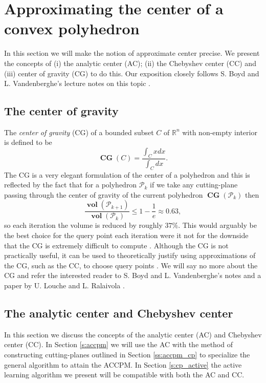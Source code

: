 \documentclass[11pt]{amsart}
\theoremstyle{definition}
\theoremstyle{remark}
\DeclareMathOperator{\CG}{\textbf{CG}}
\DeclareMathOperator{\vol}{\textbf{vol}}
\begin{document}
\section{Approximating the center of a convex polyhedron}
    In this section we will make the notion of approximate center precise. We present the concepts of (i) the analytic center (AC); (ii) the Chebyshev center (CC) and (iii) center of gravity (CG) to do this. Our exposition closely follows S. Boyd and L. Vandenberghe's lecture notes on this topic \cite[Section 4]{BV11}.  

    \subsection{The center of gravity}
        The \emph{center of gravity} (CG) of a bounded subset $C$ of $\mathbb{R}^n$ with non-empty interior is defined to be
        \begin{equation*}
            \CG(C) = \frac{\int_C x dx}{\int_C dx}.
        \end{equation*}
        The CG is a very elegant formulation of the center of a polyhedron and this is reflected by the fact \cite[Section 4.2]{BV11} that for a polyhedron $\mathcal{P}_k$ if we take any cutting-plane passing through the center of gravity of the current polyhedron $\CG(\mathcal{P}_k)$ then
        \begin{equation*}
            \frac{\vol(\mathcal{P}_{k+1})}{\vol(\mathcal{P}_k)} \leq 1 - \frac{1}{e} \approx 0.63,
        \end{equation*}
        so each iteration the volume is reduced by roughly $37\%$. This would arguably be the best choice for the query point each iteration were it not for the downside that the CG is extremely difficult to compute \cite[Section 4.2]{BV11}. Although the CG is not practically useful, it can be used to theoretically justify using approximations of the CG, such as the CC, to choose query points \cite[Section II.C]{LR15}. We will say no more about the CG and refer the interested reader to S. Boyd and L. Vandenberghe's  notes \cite[Section 4.2]{BV11} and a paper by U. Louche and L. Ralaivola \cite[Section II.C]{LR15}. 

    \subsection{The analytic center and Chebyshev center}
        In this section we discuss the concepts of the analytic center (AC) and Chebyshev center (CC). In Section \ref{s:accpm} we will use the AC with the method of constructing cutting-planes outlined in Section \ref{ss:accpm_cp} to specialize the general algorithm to attain the ACCPM. In Section \ref{s:cp_active} the active learning algorithm we present will be compatible with both the AC and CC. 
\end{document}

